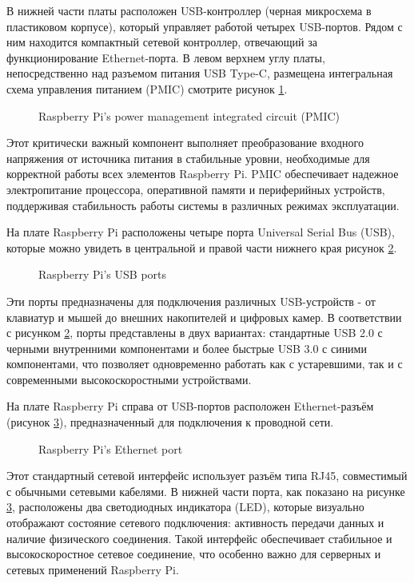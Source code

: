 В нижней части платы расположен USB-контроллер (черная микросхема в пластиковом корпусе), который управляет работой четырех USB-портов. Рядом с ним находится компактный сетевой контроллер, отвечающий за функционирование Ethernet-порта. В левом верхнем углу платы, непосредственно над разъемом питания USB Type-C, размещена интегральная схема управления питанием (PMIC) смотрите рисунок \ref{fig:pmic}.

\begin{figure}[H]
	\centering
	\caption{Raspberry Pi’s power management integrated circuit (PMIC)}
	\label{fig:pmic}
\end{figure}

Этот критически важный компонент выполняет преобразование входного напряжения от источника питания в стабильные уровни, необходимые для корректной работы всех элементов Raspberry Pi. PMIC обеспечивает надежное электропитание процессора, оперативной памяти и периферийных устройств, поддерживая стабильность работы системы в различных режимах эксплуатации.

На плате Raspberry Pi расположены четыре порта Universal Serial Bus (USB), которые можно увидеть в центральной и правой части нижнего края рисунок \ref{fig:usb}.

\begin{figure}[H]
	\centering
	\caption{Raspberry Pi’s USB ports}
	\label{fig:usb}
\end{figure}

Эти порты предназначены для подключения различных USB-устройств - от клавиатур и мышей до внешних накопителей и цифровых камер. В соответствии с рисунком \ref{fig:usb}, порты представлены в двух вариантах: стандартные USB 2.0 с черными внутренними компонентами и более быстрые USB 3.0 с синими компонентами, что позволяет одновременно работать как с устаревшими, так и с современными высокоскоростными устройствами.

На плате Raspberry Pi справа от USB-портов расположен Ethernet-разъём (рисунок \ref{fig:ethernet}), предназначенный для подключения к проводной сети.

\begin{figure}[H]
	\centering
	\caption{Raspberry Pi’s Ethernet port}
	\label{fig:ethernet}
\end{figure}

Этот стандартный сетевой интерфейс использует разъём типа RJ45, совместимый с обычными сетевыми кабелями. В нижней части порта, как показано на рисунке \ref{fig:ethernet}, расположены два светодиодных индикатора (LED), которые визуально отображают состояние сетевого подключения: активность передачи данных и наличие физического соединения. Такой интерфейс обеспечивает стабильное и высокоскоростное сетевое соединение, что особенно важно для серверных и сетевых применений Raspberry Pi.

